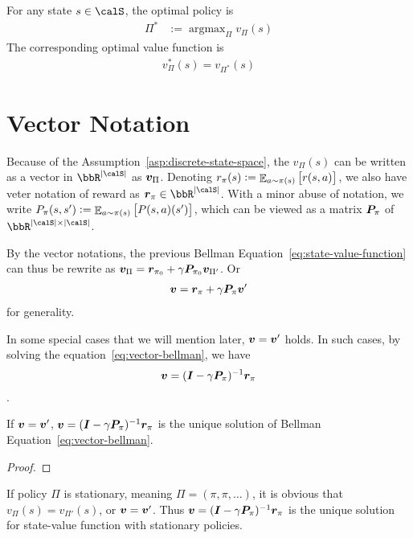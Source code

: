 \begin{definition}\label{def:optimal-policy}
    For any state $s \in \calS$, the optimal policy is
    \begin{align}
        \Pi^* &:= \mathop{\arg \max}_\Pi v_\Pi(s) \nonumber
    \end{align}
    The corresponding optimal value function is \begin{align}v^*_\Pi(s) = v_{\Pi^*}(s) \nonumber \end{align}
\end{definition}

\section{Vector Notation}
Because of the Assumption~\ref{asp:discrete-state-space}, the $v_\Pi(s)$ can be written as a vector in $\bbR^{|\calS|}$ as $\bm{v}_\Pi$.
Denoting $r_\pi(s) := \mathop{\mathbb{E}}_{a \sim \pi(s)} \left[ r(s, a) \right]$, we also have veter notation of reward as $\vect{r}_\pi \in \bbR^{|\calS|}$.
With a minor abuse of notation, we write $P_\pi(s, s') := \mathop{\mathbb{E}}_{a \sim \pi(s)} \left[ P(s, a)(s') \right]$, which can be viewed as a matrix $\bm{P}_\pi$ of $\bbR^{|\calS|\times|\calS|}$.

By the vector notations, the previous Bellman Equation~\ref{eq:state-value-function} can thus be rewrite as
$\displaystyle
    \bm{v}_\Pi  = \bm{r}_{\pi_0} + \gamma \bm{P}_{\pi_0} \bm{v}_{\Pi'} \nonumber
$.
Or \begin{align}
    \bm{v}  = \bm{r}_{\pi} + \gamma \bm{P}_{\pi} \bm{v}' \label{eq:vector-bellman}
\end{align} for generality.

In some special cases that we will mention later, $\bm{v} = \bm{v}'$ holds. In such cases, by solving the equation~\ref{eq:vector-bellman}, we have
$$\bm{v} = (\bm{I} - \gamma \bm{P}_\pi)^{-1} \bm{r}_\pi$$.

\begin{lemma}
    If $\bm{v} = \bm{v}'$, $\bm{v} = (\bm{I} - \gamma \bm{P}_\pi)^{-1} \bm{r}_\pi$ is the unique solution of Bellman Equation~\ref{eq:vector-bellman}.
\end{lemma}

\begin{proof}
\end{proof}

\begin{example}
    If policy $\Pi$ is stationary, meaning $\Pi = (\pi, \pi, \dots)$, it is obvious that $v_\Pi(s) = v_{\Pi'}(s)$, or $\bm{v} = \bm{v}'$. Thus $\bm{v} = (\bm{I} - \gamma \bm{P}_\pi)^{-1} \bm{r}_\pi$ is the unique solution for state-value function with stationary policies.
\end{example}



